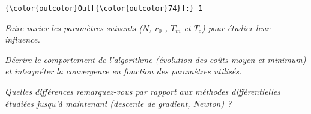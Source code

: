 \documentclass[11pt]{article}
\begin{document}
\begin{Verbatim}[commandchars=\\\{\}]
{\color{outcolor}Out[{\color{outcolor}74}]:} 1
\end{Verbatim}
            
    \emph{Faire varier les paramètres suivants (\(N\), \(r_0\) , \(T_m\) et
\(T_c\)) pour étudier leur influence.}

    \emph{Décrire le comportement de l'algorithme (évolution des coûts moyen
et minimum) et interpréter la convergence en fonction des paramètres
utilisés.}

    \emph{Quelles différences remarquez-vous par rapport aux méthodes
différentielles étudiées jusqu'à maintenant (descente de gradient,
Newton) ?}


    
    
    
    
\end{document}
